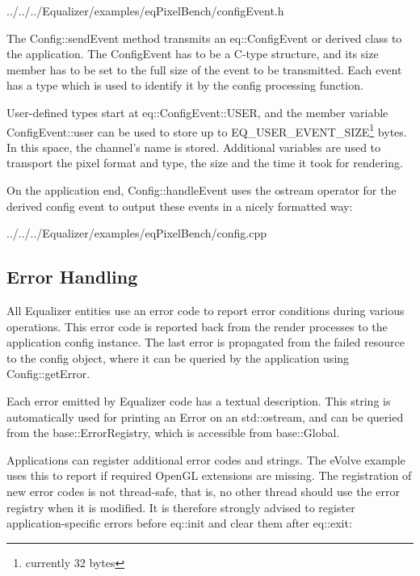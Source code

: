\documentclass[10pt,a4]{scrartcl}
\begin{document}
{\footnotesize
  {../../../Equalizer/examples/eqPixelBench/configEvent.h}}


The \textsf{Config::sendEvent} method transmits an
\textsf{eq::ConfigEvent} or derived class to the application. The
ConfigEvent has to be a C-type structure, and its \textsf{size}
member has to be set to the full size of the event to be transmitted.
Each event has a type which is used to identify it by the config 
processing function.

User-defined types start at \textsf{eq::ConfigEvent::USER}, and the
member variable \textsf{ConfigEvent::user} can be used to store up to
\textsf{EQ\_USER\_EVENT\_SIZE}\footnote{currently 32 bytes} bytes. In
this space, the channel's name is stored. Additional variables are used
to transport the pixel format and type, the size and the time it took
for rendering.

On the application end, \textsf{Config::handleEvent} uses the
\textsf{ostream} operator for the derived config event to output these
events in a nicely formatted way:

{\footnotesize
  {../../../Equalizer/examples/eqPixelBench/config.cpp}}


\subsection{\label{sErrorHandling}Error Handling}

All Equalizer entities use an error code to report error conditions during
various operations. This error code is reported back from the render processes
to the application config instance. The last error is propagated from the failed
resource to the config object, where it can be queried by the application using
\textsf{Config::getError}.

Each error emitted by Equalizer code has a textual description. This string is
automatically used for printing an \textsf{Error} on an \textsf{std::ostream},
and can be queried from the \textsf{base::ErrorRegistry}, which is accessible
from \textsf{base::Global}.

Applications can register additional error codes and strings. The
\textsf{eVolve} example uses this to report if required OpenGL extensions are
missing. The registration of new error codes is not thread-safe, that is, no
other thread should use the error registry when it is modified. It is therefore
strongly advised to register application-specific errors before
\textsf{eq::init} and clear them after \textsf{eq::exit}:
\end{document}

